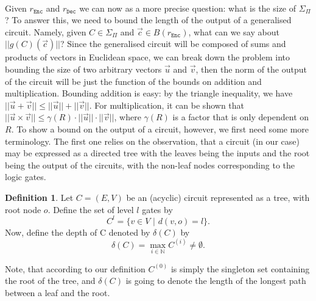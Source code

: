\documentclass{article}
\theoremstyle{definition}
\newtheorem{definition}{Definition}[section]
\theoremstyle{example}
\newcommand{\Enc}{\texttt{Enc}}
\newcommand{\Dec}{\texttt{Dec}}
\newcommand{\Nat}{\mathbb{N}}
\newcommand{\norm}[1]{||#1||}
\begin{document}
\paragraph{} Given $r_\Enc$ and $r_\Dec$ we can now as a more precise question:
what is the size of $\Sigma_\Pi$? To answer this, we need to bound the length of
the output of a generalised circuit. Namely, given $C \in \Sigma_\Pi$ and $\vec{c}
\in B(r_\Enc)$, what can we say about $\norm{g(C)(\vec{c})}$? Since the
generalised circuit will be composed of sums and products of vectors in
Euclidean space, we can break down the problem into bounding the size of two
arbitrary vectors $\vec{u}$ and $\vec{v}$, then the norm of the output of the
circuit will be just the function of the bounds on addition and multiplication.
Bounding addition is easy: by the triangle inequality, we have $\norm{\vec{u} +
  \vec{v}} \leq \norm{\vec{u}} + \norm{\vec{v}}$. For multiplication, it can be
shown that $\norm{\vec{u} \times \vec{v}} \leq \gamma(R) \cdot \norm{\vec{u}}
\cdot \norm{\vec{v}}$, where $\gamma(R)$ is a factor that is only dependent on $R$.
To show a bound on the output of a circuit, however, we first need some more
terminology.
The first one relies on the observation, that a circuit (in our case) may be
expressed as a directed tree with the leaves being the inputs and the root being
the output of the circuits, with the non-leaf nodes corresponding to the logic
gates.
\begin{definition}
  Let $C = (E, V)$ be an (acyclic) circuit represented as a tree, with root node
  $o$. Define the set of level $l$ gates by 
  \[
    C^{l} = \{v \in V\,\,|\,\, d(v, o) = l\}.
  \]
  Now, define the depth of C denoted by $\delta(C)$ by
  \[
    \delta(C) = \max_{i \in \Nat} C^{(i)} \neq \emptyset.
  \]
\end{definition}
Note, that according to our definition $C^{(0)}$ is simply the singleton set
containing the root of the tree, and $\delta(C)$
is going to denote the length of the longest path between a leaf and the root.
\end{document}
